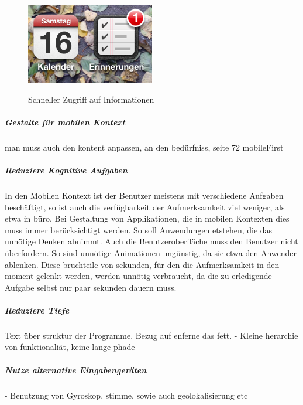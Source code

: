 \begin{figure}[h]
	\caption{Schneller Zugriff auf Informationen}
	\includegraphics[width=0.5\textwidth]{img/iconIos.png}
	\label{fig:iconIos}
\end{figure}


\subparagraph{Gestalte für mobilen Kontext}
\label{subp:gestalte_f_r_mobilen_kontext}

man muss auch den kontent anpassen, an den bedürfniss, seite 72 mobileFirst


\subparagraph{Reduziere Kognitive Aufgaben } 
\label{subp:reduziere_kognitive_aufgaben_}

In den Mobilen Kontext ist der Benutzer meistens mit verschiedene Aufgaben beschäftigt, so ist auch die verfügbarkeit der Aufmerksamkeit viel weniger, als etwa in büro. Bei Gestaltung von Applikationen, die in mobilen Kontexten dies muss immer berücksichtigt werden. So soll Anwendungen etstehen, die das unnötige Denken abnimmt. Auch die Benutzeroberfläche muss den Benutzer nicht überfordern. So sind unnötige Animationen ungünstig, da sie etwa den Anwender ablenken. Diese bruchteile von sekunden, für den die Aufmerksamkeit in den moment gelenkt werden, werden unnötig verbraucht, da die zu erledigende Aufgabe selbst nur paar sekunden dauern muss.


\subparagraph{Reduziere Tiefe} 
\label{subp:reduziere_das_w_hlen}


Text über struktur der Programme. Bezug auf enferne das fett.
- Kleine herarchie von funktionaliät, keine lange phade

\subparagraph{Nutze alternative Eingabengeräten}
\label{subp:nutze_alternative_eingabenger_ten}

- Benutzung von Gyroskop, stimme, sowie auch geolokalisierung etc


